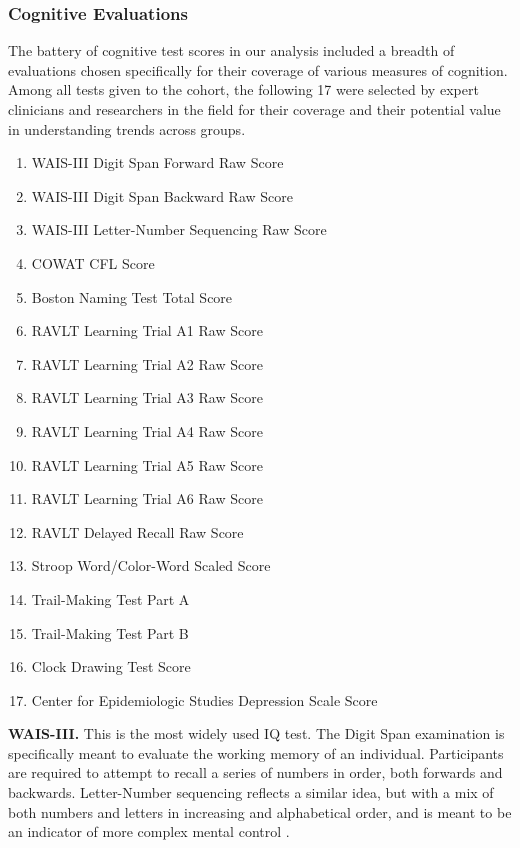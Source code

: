 \subsubsection{Cognitive Evaluations}
The battery of cognitive test scores in our analysis included a breadth of evaluations chosen specifically for their coverage of various measures of cognition. Among all tests given to the cohort, the following 17 were selected by expert clinicians and researchers in the field for their coverage and their potential value in understanding trends across groups.
{\small
\begin{multicols}{2}
\begin{enumerate}
\item WAIS-III Digit Span Forward Raw Score
\item WAIS-III Digit Span Backward Raw Score
\item WAIS-III Letter-Number Sequencing Raw Score
\item COWAT CFL Score
\item Boston Naming Test Total Score
\item RAVLT Learning Trial A1 Raw Score
\item RAVLT Learning Trial A2 Raw Score
\item RAVLT Learning Trial A3 Raw Score
\item RAVLT Learning Trial A4 Raw Score
\item RAVLT Learning Trial A5 Raw Score
\item RAVLT Learning Trial A6 Raw Score
\item RAVLT Delayed Recall Raw Score
\item Stroop Word/Color-Word Scaled Score
\item Trail-Making Test Part A
\item Trail-Making Test Part B
\item Clock Drawing Test Score
\item Center for Epidemiologic Studies Depression Scale Score
\end{enumerate} 
\end{multicols}
}

{\bf WAIS-III.} This is the most widely used IQ test. The Digit Span examination is specifically meant to evaluate the working memory of an individual. Participants are required to attempt to recall a series of numbers in order, both forwards and backwards. Letter-Number sequencing reflects a similar idea, but with a mix of both numbers and letters in increasing and alphabetical order, and is meant to be an indicator of more complex mental control \cite{wechsler2014wechsler}.

